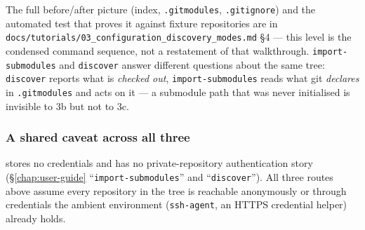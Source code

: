 The full before/after picture (index, \texttt{.gitmodules},
\texttt{.gitignore}) and the automated test that proves it against fixture
repositories are in \texttt{docs/tutorials/03\_configuration\_discovery\_modes.md}
\S4 --- this level is the condensed command sequence, not a restatement of
that walkthrough. \texttt{import-submodules} and \texttt{discover} answer
different questions about the same tree: \texttt{discover} reports what is
\emph{checked out}, \texttt{import-submodules} reads what git
\emph{declares} in \texttt{.gitmodules} and acts on it --- a submodule path
that was never initialised is invisible to 3b but not to 3c.

\subsubsection{A shared caveat across all three}

\cgspkg{} stores no credentials and has no private-repository
authentication story (\S\ref{chap:user-guide} ``\texttt{import-submodules}''
and ``\texttt{discover}''). All three routes above assume every repository
in the tree is reachable anonymously or through credentials the ambient
environment (\texttt{ssh-agent}, an HTTPS credential helper) already holds.
